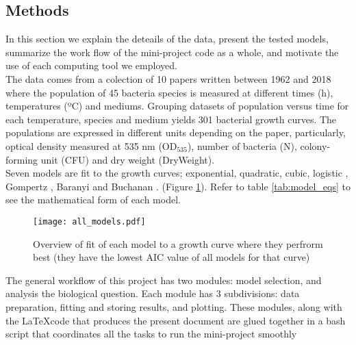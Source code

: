 \documentclass[titlepage,11pt]{article}
\begin{document}
\begin{linenumbers}
	\section{Methods}\label{methods}
	In this section we explain the deteails of the data, present the tested models, summarize the work flow of the mini-project code as a whole, and motivate the use of each computing tool we employed.\\
	
	The data comes from a colection of 10 papers written between 1962 and 2018 where the population of 45 bacteria species is measured at different times (h), temperatures (ºC) and mediums. Grouping datasets of population versus time for each temperature, species and medium yields 301 bacterial growth curves. The populations are expressed in different units depending on the paper, particularly,  optical density measured at 535 nm (OD$_{535} $), number of bacteria (N), colony-forming unit (CFU) and dry weight (DryWeight).\\
	Seven models are fit to the growth curves; exponential, quadratic, cubic, logistic \cite{Pearl1920, Verhulst1838}, Gompertz \cite{Zwietering1990}, Baranyi \cite{Baranyi1994} and Buchanan \cite{Buchanan1997}. (Figure \ref{all_models}). Refer to table \ref{tab:model_eqs} to see the mathematical form of each model.\\
	
	\begin{figure}[h]
		\texttt{[image: all\_models.pdf]}
		\centering
		\caption{Overview of fit of each model to a growth curve where they perfrorm best (they have the lowest AIC value of all models for that curve)}
		\label{all_models}
	\end{figure}

	The general workflow of this project has two modules: model selection, and analysis the biological question.  Each module has 3 subdivisions: data preparation, fitting and storing results, and plotting. These modules, along with the \LaTeX code that produces the present document are glued together in a bash script that coordinates all the tasks to run the mini-project smoothly

\end{linenumbers}
\end{document}
